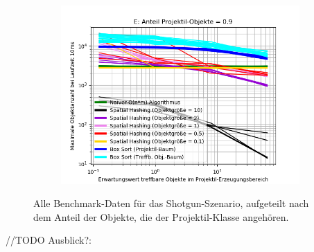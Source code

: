 \begin{figure}
\begin{subfigure}[t]{0.55\textwidth}
		\label{fig:shotgunComparison-D}
	\end{subfigure}
~
	\begin{subfigure}[t]{0.55\textwidth}
		\centering
		\includegraphics[width=1\textwidth]{./res/shotgunComparison-E.png}

		\label{fig:shotgunComparison-E}
	\end{subfigure}

	\caption{Alle Benchmark-Daten für das Shotgun-Szenario, aufgeteilt nach dem Anteil der Objekte, die der Projektil-Klasse angehören.}
	\label{fig:shotgunComparison}
\end{figure}

//TODO Ausblick?:



